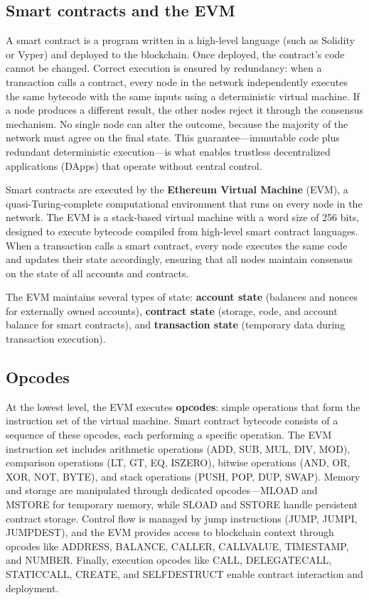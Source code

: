 \subsection{Smart contracts and the EVM}
A smart contract is a program written in a high-level language (such as Solidity or Vyper) and deployed to the blockchain. Once deployed, the contract's code cannot be changed. Correct execution is ensured by redundancy: when a transaction calls a contract, every node in the network independently executes the same bytecode with the same inputs using a deterministic virtual machine. If a node produces a different result, the other nodes reject it through the consensus mechanism. No single node can alter the outcome, because the majority of the network must agree on the final state. This guarantee---immutable code plus redundant deterministic execution---is what enables trustless decentralized applications (DApps) that operate without central control.

Smart contracts are executed by the \textbf{Ethereum Virtual Machine} (EVM), a quasi-Turing-complete computational environment that runs on every node in the network. The EVM is a stack-based virtual machine with a word size of 256 bits, designed to execute bytecode compiled from high-level smart contract languages. When a transaction calls a smart contract, every node executes the same code and updates their state accordingly, ensuring that all nodes maintain consensus on the state of all accounts and contracts.

The EVM maintains several types of state: \textbf{account state} (balances and nonces for externally owned accounts), \textbf{contract state} (storage, code, and account balance for smart contracts), and \textbf{transaction state} (temporary data during transaction execution).

\subsection{Opcodes}
At the lowest level, the EVM executes \textbf{opcodes}: simple operations that form the instruction set of the virtual machine. Smart contract bytecode consists of a sequence of these opcodes, each performing a specific operation. The EVM instruction set includes arithmetic operations (ADD, SUB, MUL, DIV, MOD), comparison operations (LT, GT, EQ, ISZERO), bitwise operations (AND, OR, XOR, NOT, BYTE), and stack operations (PUSH, POP, DUP, SWAP). Memory and storage are manipulated through dedicated opcodes—MLOAD and MSTORE for temporary memory, while SLOAD and SSTORE handle persistent contract storage. Control flow is managed by jump instructions (JUMP, JUMPI, JUMPDEST), and the EVM provides access to blockchain context through opcodes like ADDRESS, BALANCE, CALLER, CALLVALUE, TIMESTAMP, and NUMBER. Finally, execution opcodes like CALL, DELEGATECALL, STATICCALL, CREATE, and SELFDESTRUCT enable contract interaction and deployment.

